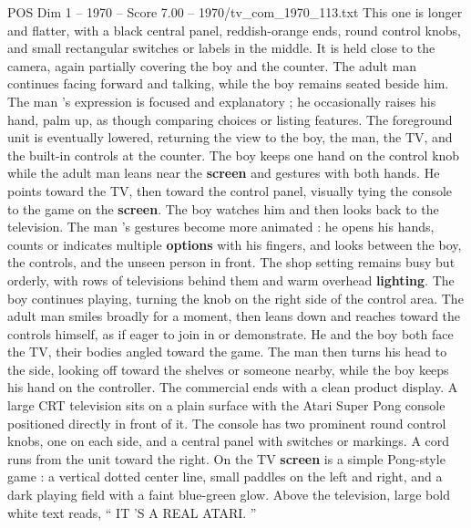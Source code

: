 \begin{textsample}{POS Dim 1 – 1970 – Score 7.00 – 1970/tv\_com\_1970\_113.txt}
This one is longer and flatter, with a black central panel, reddish-orange ends, round control knobs, and small rectangular switches or labels in the middle.
It is held close to the camera, again partially covering the boy and the counter.
The adult man continues facing forward and talking, while the boy remains seated beside him.
The man ’s expression is focused and explanatory ; he occasionally raises his hand, palm up, as though comparing choices or listing features.
The foreground unit is eventually lowered, returning the view to the boy, the man, the TV, and the built-in controls at the counter.
The boy keeps one hand on the control knob while the adult man leans near the \textbf{screen} and gestures with both hands.
He points toward the TV, then toward the control panel, visually tying the console to the game on the \textbf{screen}.
The boy watches him and then looks back to the television.
The man ’s gestures become more animated : he opens his hands, counts or indicates multiple \textbf{options} with his fingers, and looks between the boy, the controls, and the unseen person in front.
The shop setting remains busy but orderly, with rows of televisions behind them and warm overhead \textbf{lighting}.
The boy continues playing, turning the knob on the right side of the control area.
The adult man smiles broadly for a moment, then leans down and reaches toward the controls himself, as if eager to join in or demonstrate.
He and the boy both face the TV, their bodies angled toward the game.
The man then turns his head to the side, looking off toward the shelves or someone nearby, while the boy keeps his hand on the controller.
The commercial ends with a clean product display.
A large CRT television sits on a plain surface with the Atari Super Pong console positioned directly in front of it.
The console has two prominent round control knobs, one on each side, and a central panel with switches or markings.
A cord runs from the unit toward the right.
On the TV \textbf{screen} is a simple Pong-style game : a vertical dotted center line, small paddles on the left and right, and a dark playing field with a faint blue-green glow.
Above the television, large bold white text reads, “ IT ’S A REAL ATARI. ”

\end{textsample}
